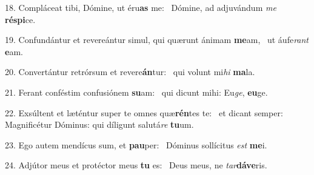 18. Compláceat tibi, Dómine, ut éru\textbf{as} me: \ast\  Dómine, ad adjuvándum \textit{me} \textbf{ré}\textbf{spi}ce.\

19. Confundántur et revereántur simul, qui quærunt ánimam \textbf{me}am, \ast\  ut áufe\textit{rant} \textbf{e}am.\

20. Convertántur retrórsum et revere\textbf{án}tur: \ast\  qui volunt mi\textit{hi} \textbf{ma}la.\

21. Ferant conféstim confusiónem \textbf{su}am: \ast\  qui dicunt mihi: Eu\textit{ge}, \textbf{eu}ge.\

22. Exsúltent et læténtur super te omnes quæ\textbf{rén}tes te: \ast\  et dicant semper: Magnificétur Dóminus: qui díligunt salutá\textit{re} \textbf{tu}um.\

23. Ego autem mendícus sum, et \textbf{pau}per: \ast\  Dóminus sollícitus \textit{est} \textbf{me}i.\

24. Adjútor meus et protéctor meus \textbf{tu} es: \ast\  Deus meus, ne \textit{tar}\textbf{dá}\textbf{ve}ris.\

